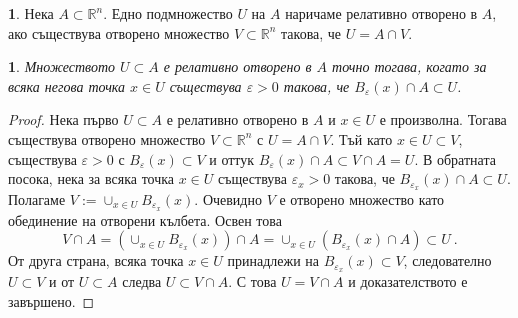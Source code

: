\documentclass[11pt]{article}
\numberwithin{equation}{section}
\numberwithin{figure}{section}
\numberwithin{table}{section}
\theoremstyle{plain}
\theoremstyle{definition}
\newtheorem{defn}[thm]{\protect\definitionname}
\theoremstyle{remark}
\theoremstyle{definition}
\theoremstyle{remark}
\theoremstyle{plain}
\theoremstyle{definition}
\theoremstyle{definition}
\theoremstyle{plain}
\theoremstyle{plain}
\newtheorem{prop}[thm]{\protect\propositionname}
\theoremstyle{plain}
\theoremstyle{definition}
\theoremstyle{plain}
\providecommand{\definitionname}{Дефиниция}
\providecommand{\propositionname}{Твърдение}
\newcommand*{\R}{\mathbb{R}}
\begin{document}
\begin{defn} Нека $A \subset \R^n$. Едно подмножество $U$ на $A$ наричаме релативно отворено в $A$, ако съществува отворено множество $V\subset \R^n$ такова, че $U = A\cap V$.
\end{defn}
\begin{prop}
Множеството $U\subset A$ е релативно отворено в $A$ точно тогава, когато за всяка негова точка $x\in U$ съществува $\varepsilon >0$ такова, че $B_\varepsilon (x)\cap A \subset U$.
\end{prop}
\begin{proof}
Нека първо $U\subset A$ е релативно отворено в $A$ и $x\in U$ е произволна. Тогава съществува отворено множество $V\subset \R^n$ с $U = A\cap V$. Тъй като $x\in U\subset V$, съществува $\varepsilon >0$ с $B_\varepsilon (x) \subset V$ и оттук $B_\varepsilon (x)\cap A \subset V\cap A=U$. В обратната посока, нека за всяка точка $x\in U$ съществува $\varepsilon_x >0$ такова, че $B_{\varepsilon_x} (x)\cap A \subset U$. Полагаме
$V:= \cup_{ x\in U} B_{\varepsilon_x} (x)$. Очевидно $V$ е отворено множество като обединение на отворени кълбета. Освен това
$$V\cap A=\left(\cup_{ x\in U} B_{\varepsilon_x} (x)\right)\cap A=\cup_{ x\in U}\left( B_{\varepsilon_x} (x)\cap A\right)\subset U \ .$$
От друга страна, всяка точка $x\in U$ принадлежи на $B_{\varepsilon_x} (x) \subset V$, следователно $U\subset V$ и от $U\subset A$ следва $U\subset V\cap A$. С това $U= V\cap A$ и доказателството е завършено.
\end{proof}
\end{document}
